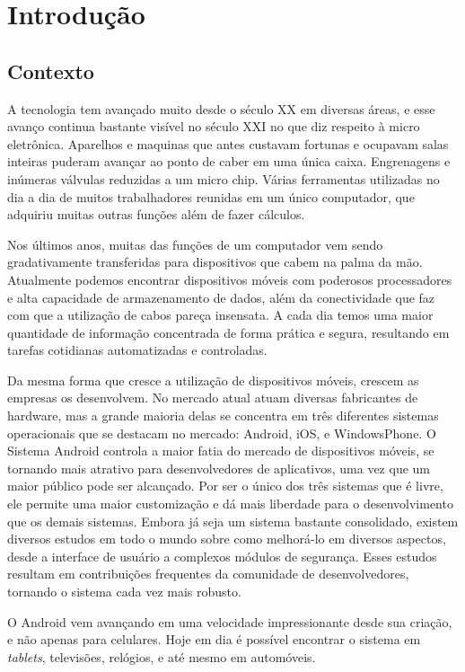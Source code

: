 \chapter{Introdução}
\section{Contexto}
A tecnologia tem avançado muito desde o século XX em diversas áreas, e esse avanço continua bastante visível no século XXI no que diz respeito à micro eletrônica. Aparelhos e maquinas que antes custavam fortunas e ocupavam salas inteiras puderam avançar ao ponto de caber em uma única caixa. Engrenagens e inúmeras válvulas reduzidas a um micro chip. Várias ferramentas utilizadas no dia a dia de muitos trabalhadores reunidas em um único computador, que adquiriu muitas outras funções além de fazer cálculos.

Nos últimos anos, muitas das funções de um computador vem sendo gradativamente transferidas para dispositivos que cabem na palma da mão. Atualmente podemos encontrar dispositivos móveis com poderosos processadores e alta capacidade de armazenamento de dados, além da conectividade que faz com que a utilização de cabos pareça insensata. A cada dia temos uma maior quantidade de informação concentrada de forma prática e segura, resultando em tarefas cotidianas automatizadas e controladas.

Da mesma forma que cresce a utilização de dispositivos móveis, crescem as empresas os desenvolvem. No mercado atual atuam diversas fabricantes de hardware, mas a grande maioria delas se concentra em três diferentes sistemas operacionais que se destacam no mercado: Android, iOS, e WindowsPhone. O Sistema Android controla a maior fatia do mercado de dispositivos móveis, se tornando mais atrativo para desenvolvedores de aplicativos, uma vez que um maior público pode ser alcançado. Por ser o único dos três sistemas que é livre, ele permite uma maior customização e dá mais liberdade para o desenvolvimento que os demais sistemas. Embora já seja um sistema bastante consolidado, existem diversos estudos em todo o mundo sobre como melhorá-lo em diversos aspectos, desde a interface de usuário a complexos módulos de segurança. Esses estudos resultam em contribuições frequentes da comunidade de desenvolvedores, tornando o sistema cada vez mais robusto.

O Android vem avançando em uma velocidade impressionante desde sua criação, e não apenas para celulares. Hoje em dia é possível encontrar o sistema em \textit{tablets}, televisões, relógios, e até mesmo em automóveis.

